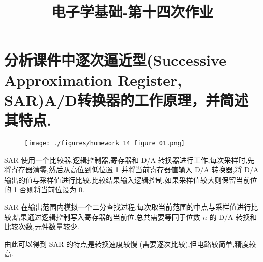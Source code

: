 
\usepackage{../../homeworks_preamble}
\title{电子学基础-第十四次作业}


    \maketitle
    \section{分析课件中逐次逼近型(Successive Approximation Register, SAR)A/D转换器的工作原理，并简述其特点.}
    \begin{figure}[htbp]
        \centering
        \texttt{[image: ./figures/homework\_14\_figure\_01.png]}
    \end{figure}
    
    SAR 使用一个比较器,逻辑控制器,寄存器和 D/A 转换器进行工作,每次采样时,先将寄存器清零,然后从高位到低位置 1 并将当前寄存器值输入 D/A 转换器,将 D/A 输出的值与采样值进行比较,比较结果输入逻辑控制,如果采样值较大则保留当前位的 1 否则将当前位设为 0.

    SAR 在输出范围内模拟一个二分查找过程,每次取当前范围的中点与采样值进行比较,结果通过逻辑控制写入寄存器的当前位.总共需要等同于位数 $n$ 的 D/A 转换和比较次数,元件数量较少.

    由此可以得到 SAR 的特点是转换速度较慢 (需要逐次比较),但电路较简单,精度较高.

